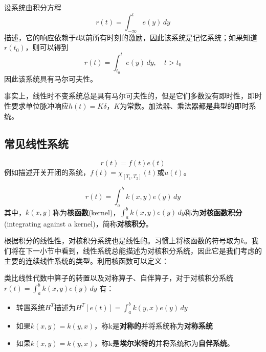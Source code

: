 \begin{example}[积分方程]
    设系统由积分方程
    $$r(t)=\int_{-\infty}^{t}e(y)\,dy$$
    描述，它的响应依赖于$t$以前所有时刻的激励，因此该系统是记忆系统；如果知道$r(t_0)$，则可以得到
    $$r(t)=\int_{t_0}^{t}e(y)\,dy,\quad t>t_0$$
    因此该系统具有马尔可夫性。
\end{example}

事实上，线性时不变系统总是具有马尔可夫性的，但是它们多数没有即时性，即时性要求单位脉冲响应$h(t)=K\delta$，$K$为常数。加法器、乘法器都是典型的即时系统。

\subsection{常见线性系统}\label{sub:ordinary_system}

\begin{example}[时域乘积]
\begin{equation*}
    r(t)=f(t)e(t)
\end{equation*}
例如描述开关开闭的系统，$f(t)=\chi_{[T_1,T_2]}(t)$或$u(t)$。
\end{example}

\begin{example}[对核积分]
\begin{equation*}
    r(t)=\int_{a}^{b}k(x,y)e(y)\,dy
\end{equation*}
其中，$k(x,y)$称为\textbf{核函数}(kernel)，$\int_{a}^{b}k(x,y)e(y)\,dy$称为\textbf{对核函数积分}(integrating against a kernel)，简称\textbf{对核积分}。
\end{example}
根据积分的线性性，对核积分系统也是线性的。习惯上将核函数的符号取为$k$。我们将在下一小节中看到，线性系统总能描述为对核积分系统，因此它是我们考虑的主要的连续线性系统的类型。利用核函数可以定义：

\begin{definition}[转置系统对称系统与自伴系统]
    类比线性代数中算子的转置以及对称算子、自伴算子，对于对核积分系统
    $r(t)=\int_{a}^{b}k(x,y)e(y)\,dy$
    有：
\begin{itemize}
    \item 转置系统$H^T$描述为$H^T[e(t)]=\int_{a}^{b}k(y,x)e(y)\,dy$
    \item 如果$k(x,y)=k(y,x)$，称k是\textbf{对称的}并将系统称为\textbf{对称系统}
    \item 如果$k(x,y)=\overline{k(y,x)}$，称k是\textbf{埃尔米特的}并将系统称为\textbf{自伴系统}。
\end{itemize}
\end{definition}


